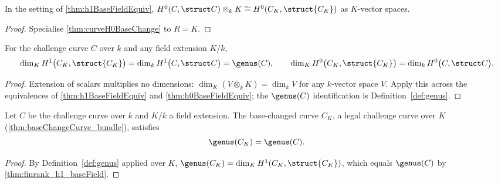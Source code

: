 \begin{theorem}
  \label{thm:h0BaseFieldEquiv}
  \leanok
  In the setting of \ref{thm:h1BaseFieldEquiv},
  \(H^0(C, \struct C) \otimes_k K \cong H^0(C_K, \struct{C_K})\) as \(K\)-vector
  spaces.
\end{theorem}
\begin{proof}
  \leanok
  Specialise \ref{thm:curveH0BaseChange} to \(R = K\).
\end{proof}

\begin{theorem}
  \label{thm:finrank_h1_baseField}
  \leanok
  For the challenge curve \(C\) over \(k\) and any field extension \(K/k\),
  \[
    \dim_K H^1\bigl(C_K, \struct{C_K}\bigr) = \dim_k H^1\bigl(C, \struct C\bigr)
      = \genus(C),
    \qquad
    \dim_K H^0\bigl(C_K, \struct{C_K}\bigr) = \dim_k H^0\bigl(C, \struct C\bigr).
  \]
\end{theorem}
\begin{proof}
  \leanok
  Extension of scalars multiplies no dimensions:
  \(\dim_K(V \otimes_k K) = \dim_k V\) for any \(k\)-vector space \(V\). Apply this
  across the equivalences of \ref{thm:h1BaseFieldEquiv} and \ref{thm:h0BaseFieldEquiv};
  the \(\genus(C)\) identification is Definition~\ref{def:genus}.
\end{proof}

\begin{theorem}
  \label{thm:genus_baseField}
  \leanok
  Let \(C\) be the challenge curve over \(k\) and \(K/k\) a field extension. The
  base-changed curve \(C_K\), a legal challenge curve over \(K\)
  (\ref{thm:baseChangeCurve_bundle}), satisfies
  \[
    \genus(C_K) = \genus(C).
  \]
\end{theorem}
\begin{proof}
  \leanok
  By Definition~\ref{def:genus} applied over \(K\),
  \(\genus(C_K) = \dim_K H^1(C_K, \struct{C_K})\), which equals \(\genus(C)\) by
  \ref{thm:finrank_h1_baseField}.
\end{proof}
